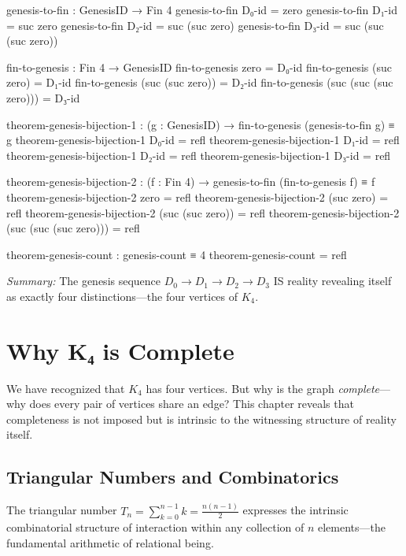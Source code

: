 \documentclass[11pt,a4paper]{book}
\begin{document}
\begin{code}
genesis-to-fin : GenesisID → Fin 4
genesis-to-fin D₀-id = zero
genesis-to-fin D₁-id = suc zero
genesis-to-fin D₂-id = suc (suc zero)
genesis-to-fin D₃-id = suc (suc (suc zero))

fin-to-genesis : Fin 4 → GenesisID
fin-to-genesis zero = D₀-id
fin-to-genesis (suc zero) = D₁-id
fin-to-genesis (suc (suc zero)) = D₂-id
fin-to-genesis (suc (suc (suc zero))) = D₃-id

theorem-genesis-bijection-1 : (g : GenesisID) → fin-to-genesis (genesis-to-fin g) ≡ g
theorem-genesis-bijection-1 D₀-id = refl
theorem-genesis-bijection-1 D₁-id = refl
theorem-genesis-bijection-1 D₂-id = refl
theorem-genesis-bijection-1 D₃-id = refl

theorem-genesis-bijection-2 : (f : Fin 4) → genesis-to-fin (fin-to-genesis f) ≡ f
theorem-genesis-bijection-2 zero = refl
theorem-genesis-bijection-2 (suc zero) = refl
theorem-genesis-bijection-2 (suc (suc zero)) = refl
theorem-genesis-bijection-2 (suc (suc (suc zero))) = refl

theorem-genesis-count : genesis-count ≡ 4
theorem-genesis-count = refl
\end{code}

\medskip
\noindent\textit{Summary:} The genesis sequence $D_0 \to D_1 \to D_2 \to D_3$ IS reality 
revealing itself as exactly four distinctions—the four vertices of $K_4$.


\chapter{Why K₄ is Complete}
\label{chap:why-complete}

We have recognized that $K_4$ has four vertices. But why is the graph \emph{complete}—why 
does every pair of vertices share an edge? This chapter reveals that completeness 
is not imposed but is intrinsic to the witnessing structure of reality itself.

\section{Triangular Numbers and Combinatorics}

The triangular number $T_n = \sum_{k=0}^{n-1} k = \frac{n(n-1)}{2}$ expresses the intrinsic combinatorial structure of interaction within any collection of $n$ elements—the fundamental arithmetic of relational being.
\end{document}

